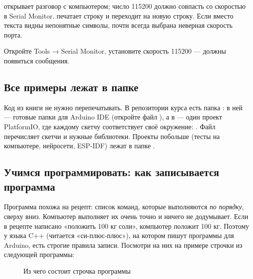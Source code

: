  открывает разговор с компьютером; число 115200 должно совпасть со скоростью
в Serial Monitor.  печатает строку и переходит на новую строку. Если вместо текста видны
непонятные символы, почти всегда выбрана неверная скорость порта.

Откройте \textsf{Tools → Serial Monitor}, установите скорость 115200 --- должны появиться сообщения.

\subsection{Все примеры лежат в папке}

Код из книги не нужно перепечатывать. В репозитории курса есть папка : в ней
 --- готовые папки для Arduino IDE (откройте файл ), а в
 --- один проект PlatformIO, где каждому скетчу соответствует своё окружение:
. Файл  перечисляет скетчи и нужные
библиотеки. Проекты побольше (тесты на компьютере, нейросети, ESP-IDF) лежат в папке .

\subsection{Учимся программировать: как записывается программа}

Программа похожа на рецепт: список команд, которые выполняются \emph{по порядку}, сверху вниз.
Компьютер выполняет их очень точно и ничего не додумывает. Если в рецепте написано «положить 100 кг
соли», компьютер положит 100 кг. Поэтому у языка C++ (читается «си-плюс-плюс»), на котором пишут
программы для Arduino, есть строгие правила записи. Посмотри на них на примере строчки из следующей
программы:

\begin{figure}[H]
\centering
{}
\caption{Из чего состоит строчка программы}
\end{figure}

